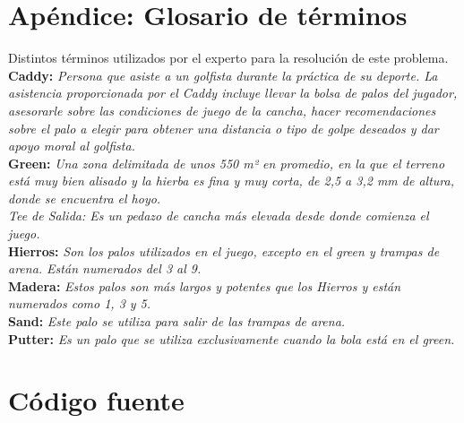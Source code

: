 \documentclass[runningheads,a4paper]{llncs}
\begin{document}
\section{Apéndice: Glosario de términos}
Distintos términos utilizados por el experto para la resolución de este problema.\\
\textbf{Caddy:} \textit{Persona que asiste a un golfista durante la práctica de su deporte. La asistencia proporcionada por el Caddy incluye llevar la bolsa de palos del jugador, asesorarle sobre las condiciones de juego de la cancha, hacer recomendaciones sobre el palo a elegir para obtener una distancia o tipo de golpe deseados y dar apoyo moral al golfista.}\\
\textbf{Green:}  \textit{Una zona delimitada de unos 550 m² en promedio, en la que el terreno está muy bien alisado y la hierba es fina y muy corta, de 2,5 a 3,2 mm de altura, donde se encuentra el hoyo.\\
Tee de Salida: Es un pedazo de cancha más elevada desde donde comienza el juego.}\\
\textbf{Hierros:} \textit{Son los palos utilizados en el juego, excepto en el green y trampas de arena. Están numerados del 3 al 9.}\\
\textbf{Madera:} \textit{Estos palos son más largos y potentes que los Hierros y están numerados como 1, 3 y 5.}\\
\textbf{Sand:} \textit{Este palo se utiliza para salir de las trampas de arena.}\\
\textbf{Putter:} \textit{Es un palo que se utiliza exclusivamente cuando la bola está en el green.}

\clearpage
\section{Código fuente}\label{sec:source}
\clearpage

\inputminted[linenos, numbersep=5pt, tabsize=4, frame=lines, label=core.clj]{clojure}{../golf-proximo-tiro/src/golf_proximo_tiro/core.clj}
\inputminted[linenos, numbersep=5pt, tabsize=4, frame=lines, label=core.clj]{clojure}{../golf-proximo-tiro/src/golf_proximo_tiro/main.clj}
\end{document}
